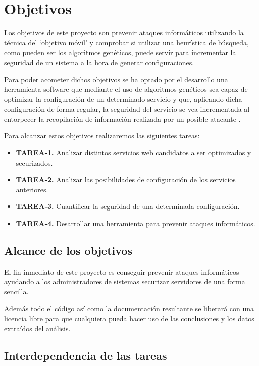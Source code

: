 \chapter{Objetivos}

Los objetivos de este proyecto son prevenir ataques informáticos utilizando la técnica del `objetivo móvil' y comprobar si utilizar una heurística de búsqueda, como pueden ser los algoritmos genéticos, puede servir para incrementar la seguridad de un sistema a la hora de generar configuraciones.

\bigskip
Para poder acometer dichos objetivos se ha optado por el desarrollo una herramienta software que mediante el uso de algoritmos genéticos sea capaz de optimizar la configuración de un determinado servicio y que, aplicando dicha configuración de forma regular, la seguridad del servicio se vea incrementada al entorpecer la recopilación de información realizada por un posible atacante \cite{john_evolutionary_2014}.

\bigskip
Para alcanzar estos objetivos realizaremos las siguientes tareas:

\begin{itemize}
  \item \textbf{TAREA-1.} Analizar distintos servicios web candidatos a ser optimizados y securizados.
  \item \textbf{TAREA-2.} Analizar las posibilidades de configuración de los servicios anteriores.
  \item \textbf{TAREA-3.} Cuantificar la seguridad de una determinada configuración.
  \item \textbf{TAREA-4.} Desarrollar una herramienta para prevenir ataques informáticos.
\end{itemize}

\section{Alcance de los objetivos}
El fin inmediato de este proyecto es conseguir prevenir ataques informáticos ayudando a los administradores de sistemas securizar servidores de una forma sencilla.

\bigskip
Además todo el código así como la documentación resultante se liberará con una licencia libre para que cualquiera pueda hacer uso de las conclusiones y los datos extraídos del análisis.

\section{Interdependencia de las tareas}

